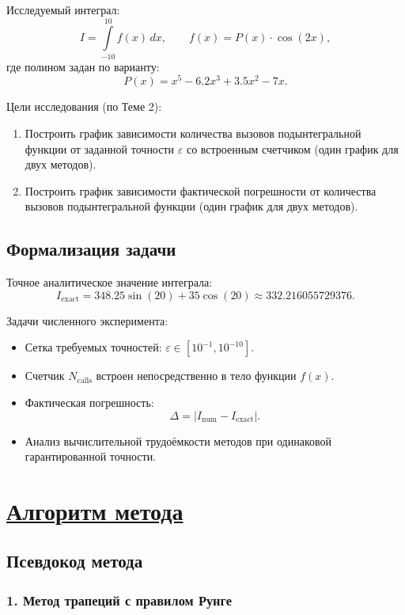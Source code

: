 \documentclass[14pt]{extarticle}
\begin{document}
	Исследуемый интеграл:
	\[
	I = \int\limits_{-10}^{10} f(x)\,dx, \qquad f(x) = P(x) \cdot \cos(2x),
	\]
	где полином задан по варианту:
	\[
	P(x) = x^5 - 6.2x^3 + 3.5x^2 - 7x.
	\]
	
	Цели исследования (по Теме 2):
	\begin{enumerate}
		\item Построить график зависимости количества вызовов подынтегральной функции от заданной точности $\varepsilon$ со встроенным счетчиком (один график для двух методов).
		\item Построить график зависимости фактической погрешности от количества вызовов подынтегральной функции (один график для двух методов).
	\end{enumerate}
	
	\subsection{Формализация задачи}
	
	Точное аналитическое значение интеграла:
	\[
	I_{\text{exact}} = 348.25 \sin(20) + 35 \cos(20) \approx 332.216055729376.
	\]
	
	Задачи численного эксперимента:
	\begin{itemize}
		\item Сетка требуемых точностей: $\varepsilon \in [10^{-1}, 10^{-10}]$.
		\item Счетчик $N_{\text{calls}}$ встроен непосредственно в тело функции $f(x)$.
		\item Фактическая погрешность:
		\[
		\Delta = |I_{\text{num}} - I_{\text{exact}}|.
		\]
		\item Анализ вычислительной трудоёмкости методов при одинаковой гарантированной точности.
	\end{itemize}
	
	
	\newpage
	\section{\Large \underline{Алгоритм метода}}
	
	\subsection{Псевдокод метода}
	
	\subsubsection{1. Метод трапеций с правилом Рунге}
	
\end{document}
